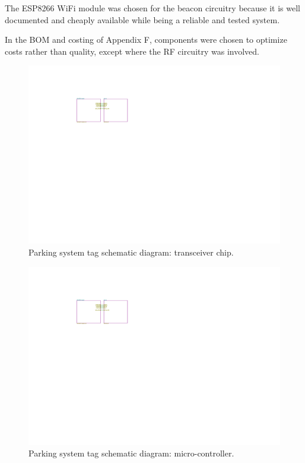 The ESP8266 WiFi module was chosen for the beacon circuitry because it is well documented and cheaply available while being a reliable and tested system.

In the BOM and costing of Appendix F, components were chosen to optimize costs rather than quality, except where the RF circuitry was involved.

\begin{figure}[H]
\begin{center}
\includegraphics[page=2,scale=0.5,trim={0cm 0cm 0cm 0cm},clip]{data/parking-system.pdf}
\caption{Parking system tag schematic diagram: transceiver chip.\cite{DW-data}}
\end{center}
\end{figure}

\begin{figure}[H]
\begin{center}
\includegraphics[page=3,scale=1,trim={10cm 8cm 10cm 5cm},clip]{data/parking-system.pdf}
\caption{Parking system tag schematic diagram: micro-controller.}
\end{center}
\end{figure}


